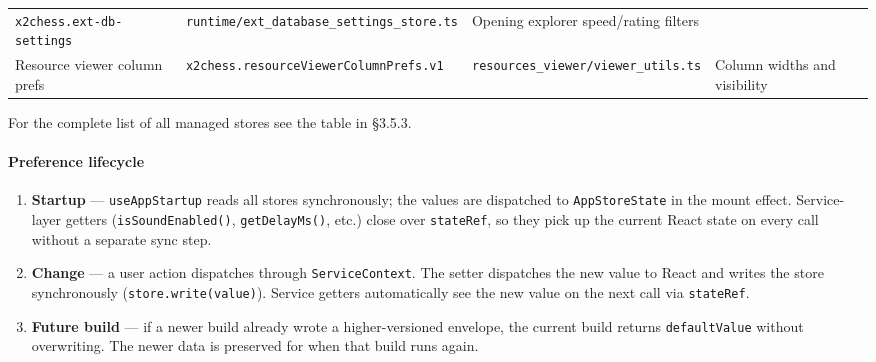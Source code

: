 \documentclass[]{article}
\providecommand{\tightlist}{%
  \setlength{\itemsep}{0pt}\setlength{\parskip}{0pt}}
\let\oldparagraph\paragraph
\renewcommand{\paragraph}[1]{\oldparagraph{#1}\mbox{}}
\begin{document}
\begin{longtable}[]{@{}llll@{}}
\begin{minipage}[t]{0.05\columnwidth}
\texttt{x2chess.ext-db-settings}\strut
\end{minipage} & \begin{minipage}[t]{0.05\columnwidth}\raggedright\strut
\texttt{runtime/ext\_database\_settings\_store.ts}\strut
\end{minipage} & \begin{minipage}[t]{0.05\columnwidth}\raggedright\strut
Opening explorer speed/rating filters\strut
\end{minipage}\tabularnewline
\begin{minipage}[t]{0.05\columnwidth}\raggedright\strut
Resource viewer column prefs\strut
\end{minipage} & \begin{minipage}[t]{0.05\columnwidth}\raggedright\strut
\texttt{x2chess.resourceViewerColumnPrefs.v1}\strut
\end{minipage} & \begin{minipage}[t]{0.05\columnwidth}\raggedright\strut
\texttt{resources\_viewer/viewer\_utils.ts}\strut
\end{minipage} & \begin{minipage}[t]{0.05\columnwidth}\raggedright\strut
Column widths and visibility\strut
\end{minipage}\tabularnewline
\bottomrule
\end{longtable}

For the complete list of all managed stores see the table in §3.5.3.

\paragraph{Preference lifecycle}\label{preference-lifecycle}

\begin{enumerate}
\def\labelenumi{\arabic{enumi}.}
\tightlist
\item
  \textbf{Startup} --- \texttt{useAppStartup} reads all stores
  synchronously; the values are dispatched to \texttt{AppStoreState} in
  the mount effect. Service-layer getters (\texttt{isSoundEnabled()},
  \texttt{getDelayMs()}, etc.) close over \texttt{stateRef}, so they
  pick up the current React state on every call without a separate sync
  step.
\item
  \textbf{Change} --- a user action dispatches through
  \texttt{ServiceContext}. The setter dispatches the new value to React
  and writes the store synchronously (\texttt{store.write(value)}).
  Service getters automatically see the new value on the next call via
  \texttt{stateRef}.
\item
  \textbf{Future build} --- if a newer build already wrote a
  higher-versioned envelope, the current build returns
  \texttt{defaultValue} without overwriting. The newer data is preserved
  for when that build runs again.
\end{enumerate}
\end{document}
